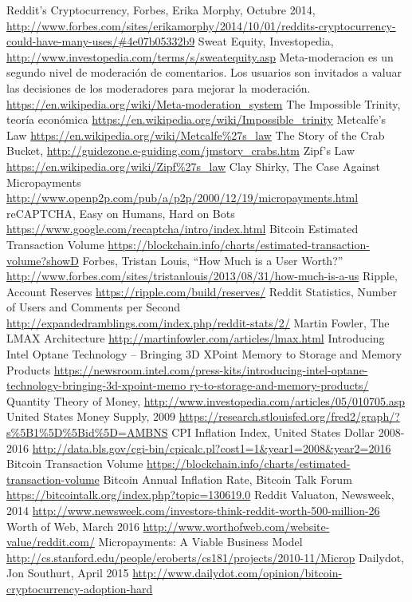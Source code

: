 \documentclass[a4paper,titlepage,final]{article}
\begin{document}
\begin{thebibliography}{99}
\raggedright
{}
Reddit’s Cryptocurrency, Forbes, Erika Morphy, Octubre 2014, \url{http://www.forbes.com/sites/erikamorphy/2014/10/01/reddits-cryptocurrency-could-have-many-uses/#4e07b05332b9} 
Sweat Equity, Investopedia, \url{http://www.investopedia.com/terms/s/sweatequity.asp}
Meta-moderacion es un segundo nivel de moderación de comentarios. Los usuarios son invitados a valuar las decisiones de los moderadores para mejorar la moderación. \url{https://en.wikipedia.org/wiki/Meta-moderation_system}
The Impossible Trinity, teoría económica \url{https://en.wikipedia.org/wiki/Impossible_trinity}
Metcalfe’s Law \url{https://en.wikipedia.org/wiki/Metcalfe%27s_law}
The Story of the Crab Bucket, \url{http://guidezone.e-guiding.com/jmstory_crabs.htm}
Zipf’s Law \url{https://en.wikipedia.org/wiki/Zipf%27s_law}
Clay Shirky, The Case Against Micropayments \url{http://www.openp2p.com/pub/a/p2p/2000/12/19/micropayments.html}
reCAPTCHA, Easy on Humans, Hard on Bots \url{https://www.google.com/recaptcha/intro/index.html}
Bitcoin Estimated Transaction Volume \url{https://blockchain.info/charts/estimated-transaction-volume?showD}
Forbes, Tristan Louis, “How Much is a User Worth?” \url{http://www.forbes.com/sites/tristanlouis/2013/08/31/how-much-is-a-us}
Ripple, Account Reserves \url{https://ripple.com/build/reserves/}
Reddit Statistics, Number of Users and Comments per Second \url{http://expandedramblings.com/index.php/reddit-stats/2/}
Martin Fowler, The LMAX Architecture \url{http://martinfowler.com/articles/lmax.html}
Introducing Intel Optane Technology – Bringing 3D XPoint Memory to Storage and Memory Products \url{https://newsroom.intel.com/press-kits/introducing-intel-optane-technology-bringing-3d-xpoint-memo ry-to-storage-and-memory-products/}
Quantity Theory of Money, \url{http://www.investopedia.com/articles/05/010705.asp} 
United States Money Supply, 2009 \url{https://research.stlouisfed.org/fred2/graph/?s%5B1%5D%5Bid%5D=AMBNS}
CPI Inflation Index, United States Dollar 2008-2016 \url{http://data.bls.gov/cgi-bin/cpicalc.pl?cost1=1&year1=2008&year2=2016}
Bitcoin Transaction Volume \url{https://blockchain.info/charts/estimated-transaction-volume}
Bitcoin Annual Inflation Rate, Bitcoin Talk Forum \url{https://bitcointalk.org/index.php?topic=130619.0}
Reddit Valuaton, Newsweek, 2014 \url{http://www.newsweek.com/investors-think-reddit-worth-500-million-26}
Worth of Web, March 2016 \url{http://www.worthofweb.com/website-value/reddit.com/}
Micropayments: A Viable Business Model \url{http://cs.stanford.edu/people/eroberts/cs181/projects/2010-11/Microp}
Dailydot, Jon Southurt, April 2015 \url{http://www.dailydot.com/opinion/bitcoin-cryptocurrency-adoption-hard}
\end{thebibliography}
\end{document}
